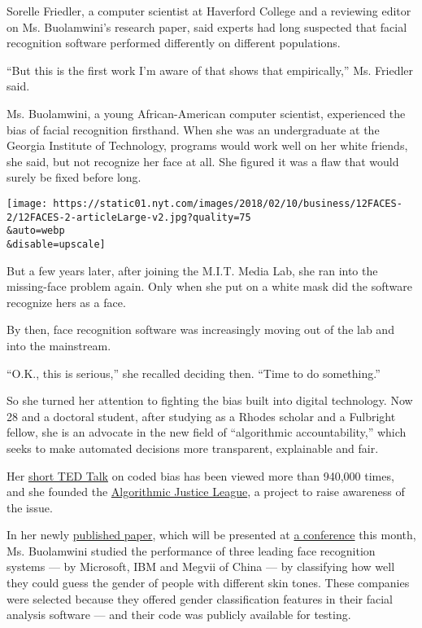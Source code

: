 Sorelle Friedler, a computer scientist at Haverford College and a
reviewing editor on Ms. Buolamwini's research paper, said experts had
long suspected that facial recognition software performed differently on
different populations.

``But this is the first work I'm aware of that shows that empirically,''
Ms. Friedler said.

Ms. Buolamwini, a young African-American computer scientist, experienced
the bias of facial recognition firsthand. When she was an undergraduate
at the Georgia Institute of Technology, programs would work well on her
white friends, she said, but not recognize her face at all. She figured
it was a flaw that would surely be fixed before long.

\texttt{[image: https://static01.nyt.com/images/2018/02/10/business/12FACES-2/12FACES-2-articleLarge-v2.jpg?quality=75\\\&auto=webp\\\&disable=upscale]}

But a few years later, after joining the M.I.T. Media Lab, she ran into
the missing-face problem again. Only when she put on a white mask did
the software recognize hers as a face.

By then, face recognition software was increasingly moving out of the
lab and into the mainstream.

``O.K., this is serious,'' she recalled deciding then. ``Time to do
something.''

So she turned her attention to fighting the bias built into digital
technology. Now 28 and a doctoral student, after studying as a Rhodes
scholar and a Fulbright fellow, she is an advocate in the new field of
``algorithmic accountability,'' which seeks to make automated decisions
more transparent, explainable and fair.

Her
\href{https://www.ted.com/talks/joy_buolamwini_how_i_m_fighting_bias_in_algorithms}{short
TED Talk} on coded bias has been viewed more than 940,000 times, and she
founded the \href{https://www.ajlunited.org/}{Algorithmic Justice
League}, a project to raise awareness of the issue.

In her newly
\href{http://proceedings.mlr.press/v81/buolamwini18a/buolamwini18a.pdf}{published
paper}, which will be presented at \href{https://fatconference.org/}{a
conference} this month, Ms. Buolamwini studied the performance of three
leading face recognition systems --- by Microsoft, IBM and Megvii of
China --- by classifying how well they could guess the gender of people
with different skin tones. These companies were selected because they
offered gender classification features in their facial analysis software
--- and their code was publicly available for testing.

